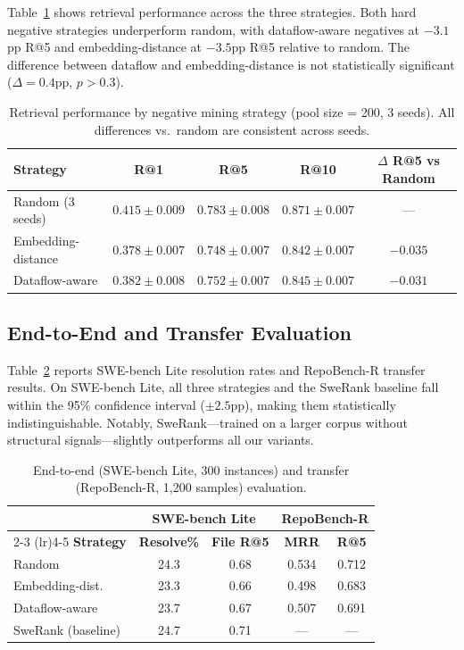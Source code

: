 \documentclass[11pt]{article}
\begin{document}
Table~\ref{tab:retrieval} shows retrieval performance across the three strategies. Both hard negative strategies underperform random, with dataflow-aware negatives at $-3.1$pp R@5 and embedding-distance at $-3.5$pp R@5 relative to random. The difference between dataflow and embedding-distance is not statistically significant ($\Delta = 0.4$pp, $p > 0.3$).

\begin{table}[t]
\centering
\caption{Retrieval performance by negative mining strategy (pool size = 200, 3 seeds). All differences vs.\ random are consistent across seeds.}
\label{tab:retrieval}
\begin{tabular}{lcccc}
\toprule
\textbf{Strategy} & \textbf{R@1} & \textbf{R@5} & \textbf{R@10} & \textbf{$\Delta$ R@5 vs Random} \\
\midrule
Random (3 seeds)      & $0.415 \pm 0.009$ & $0.783 \pm 0.008$ & $0.871 \pm 0.007$ & --- \\
Embedding-distance    & $0.378 \pm 0.007$ & $0.748 \pm 0.007$ & $0.842 \pm 0.007$ & $-0.035$ \\
Dataflow-aware        & $0.382 \pm 0.008$ & $0.752 \pm 0.007$ & $0.845 \pm 0.007$ & $-0.031$ \\
\bottomrule
\end{tabular}
\end{table}

\subsection{End-to-End and Transfer Evaluation}

Table~\ref{tab:e2e} reports SWE-bench Lite resolution rates and RepoBench-R transfer results. On SWE-bench Lite, all three strategies and the SweRank baseline fall within the 95\% confidence interval ($\pm 2.5$pp), making them statistically indistinguishable. Notably, SweRank---trained on a larger corpus without structural signals---slightly outperforms all our variants.

\begin{table}[t]
\centering
\caption{End-to-end (SWE-bench Lite, 300 instances) and transfer (RepoBench-R, 1,200 samples) evaluation.}
\label{tab:e2e}
\begin{tabular}{lcccc}
\toprule
 & \multicolumn{2}{c}{\textbf{SWE-bench Lite}} & \multicolumn{2}{c}{\textbf{RepoBench-R}} \\
\cmidrule(lr){2-3} \cmidrule(lr){4-5}
\textbf{Strategy} & \textbf{Resolve\%} & \textbf{File R@5} & \textbf{MRR} & \textbf{R@5} \\
\midrule
Random            & 24.3 & 0.68 & 0.534 & 0.712 \\
Embedding-dist.   & 23.3 & 0.66 & 0.498 & 0.683 \\
Dataflow-aware    & 23.7 & 0.67 & 0.507 & 0.691 \\
SweRank (baseline)& 24.7 & 0.71 & ---   & ---   \\
\bottomrule
\end{tabular}
\end{table}
\end{document}
